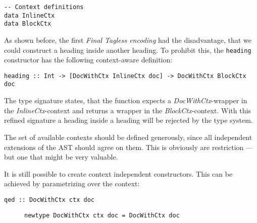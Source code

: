 \documentclass[format=acmsmall, review=true, screen=true, natbib=false]{acmart}
\begin{document}
\begin{lstlisting}
-- Context definitions
data InlineCtx
data BlockCtx
\end{lstlisting}

As shown before, the first \emph{Final Tagless encoding} had the disadvantage, that
we could construct a heading inside another heading. To prohibit this, the
\texttt{heading} constructor has the following context-aware definition:

\begin{lstlisting}
heading :: Int -> [DocWithCtx InlineCtx doc] -> DocWithCtx BlockCtx doc
\end{lstlisting}

The type signature states, that the function expects a \emph{DocWithCtx}-wrapper in
the \emph{InlineCtx}-context and returns a wrapper in the \emph{BlockCtx}-context. With
this refined signature a heading inside a heading will be rejected by the type
system.

The set of available contexts should be defined generously, since all
independent extensions of the AST should agree on them. This is obviously are
restriction — but one that might be very valuable.

It is still possible to create context independent constructors. This can be
achieved by parametrizing over the context:

\begin{lstlisting}
qed :: DocWithCtx ctx doc
\end{lstlisting}

\begin{figure}[t]
\begin{lstlisting}
newtype DocWithCtx ctx doc = DocWithCtx doc
\end{lstlisting}
\end{figure}

\printbibliography
\end{document}
